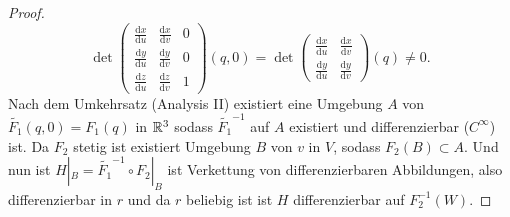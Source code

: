 \begin{remark}
\begin{proof}
\begin{equation*}
      \det \begin{pmatrix}
        \frac{\text{d}x}{\text{d}u} & \frac{\text{d}x}{\text{d}v} & 0 \\
        \frac{\text{d}y}{\text{d}u} & \frac{\text{d}y}{\text{d}v} & 0 \\
        \frac{\text{d}z}{\text{d}u} & \frac{\text{d}z}{\text{d}v} & 1
      \end{pmatrix}(q,0) = \det \begin{pmatrix}
        \frac{\text{d}x}{\text{d}u} & \frac{\text{d}x}{\text{d}v} \\
        \frac{\text{d}y}{\text{d}u} & \frac{\text{d}y}{\text{d}v}
      \end{pmatrix}(q) \neq 0\text{.}
    \end{equation*}
    Nach dem Umkehrsatz (Analysis II) existiert eine Umgebung $ A $ von $ \widetilde{F_1}(q,0) = F_1(q) $ in $ \mathbb{R}^3 $ sodass $ \widetilde{F_1}^{-1} $ auf $ A $ existiert und differenzierbar ($ C^\infty $) ist. Da $ F_2 $ stetig ist existiert Umgebung $ B $ von $ v $ in $ V $, sodass $ F_2(B) \subset A $. Und nun ist $ H|_B = \widetilde{F_1}^{-1} \circ F_2|_B $ ist Verkettung von differenzierbaren Abbildungen, also differenzierbar in $ r $ und da $ r $ beliebig ist ist $ H $ differenzierbar auf $ F_2^{-1}(W) $. 
  \end{proof}
\end{remark}


